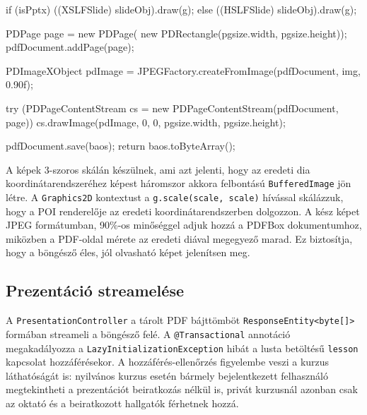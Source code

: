 \begin{java}[caption={Dia renderelés és PDF-összeállítás},label=java:pptconvert]
{{{            if (isPptx) ((XSLFSlide) slideObj).draw(g);
            else        ((HSLFSlide) slideObj).draw(g);

            PDPage page = new PDPage(
                    new PDRectangle(pgsize.width, pgsize.height));
            pdfDocument.addPage(page);

            PDImageXObject pdImage =
                    JPEGFactory.createFromImage(pdfDocument, img, 0.90f);

            try (PDPageContentStream cs =
                         new PDPageContentStream(pdfDocument, page)) {
                cs.drawImage(pdImage, 0, 0, pgsize.width, pgsize.height);
            }
        }

        pdfDocument.save(baos);
        return baos.toByteArray();
    }
}
\end{java}

A képek 3-szoros skálán készülnek, ami azt jelenti, hogy az eredeti dia koordinátarendszeréhez képest háromszor akkora felbontású \texttt{BufferedImage} jön létre. A \texttt{Graphics2D} kontextust a \texttt{g.scale(scale, scale)} hívással skálázzuk, hogy a POI renderelője az eredeti koordinátarendszerben dolgozzon. A kész képet JPEG formátumban, 90\%-os minőséggel adjuk hozzá a PDFBox dokumentumhoz, miközben a PDF-oldal mérete az eredeti diával megegyező marad. Ez biztosítja, hogy a böngésző éles, jól olvasható képet jelenítsen meg.

\subsection{Prezentáció streamelése}

A \texttt{PresentationController} a tárolt PDF bájttömböt \texttt{ResponseEntity<byte[]>} formában streameli a böngésző felé. A \texttt{@Transactional} annotáció megakadályozza a \texttt{LazyInitializationException} hibát a lusta betöltésű \texttt{lesson} kapcsolat hozzáférésekor. A hozzáférés-ellenőrzés figyelembe veszi a kurzus láthatóságát is: nyilvános kurzus esetén bármely bejelentkezett felhasználó megtekintheti a prezentációt beiratkozás nélkül is, privát kurzusnál azonban csak az oktató és a beiratkozott hallgatók férhetnek hozzá.

